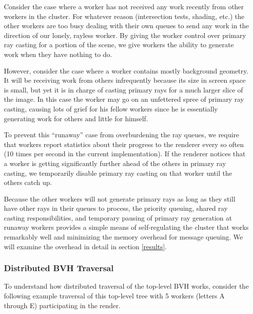 \documentclass[a4paper,twoside]{article}
\begin{document}
Consider the case where a worker has not received any work recently from other
workers in the cluster. For whatever reason (intersection tests, shading, etc.)
the other workers are too busy dealing with their own queues to send any work
in the direction of our lonely, rayless worker. By giving the worker control
over primary ray casting for a portion of the scene, we give workers the ability
to generate work when they have nothing to do.

However, consider the case where a worker contains mostly background
geometry. It will be receiving work from others infrequently because its size
in screen space is small, but yet it is in charge of casting primary rays for
a much larger slice of the image. In this case the worker may go on an
unfettered spree of primary ray casting, causing lots of grief for his fellow
workers since he is essentially generating work for others and little for
himself.

To prevent this ``runaway'' case from overburdening the ray queues, we require
that workers report statistics about their progress to the renderer every so
often (10 times per second in the current implementation). If the renderer
notices that a worker is getting significantly further ahead of the others in
primary ray casting, we temporarily disable primary ray casting on that worker
until the others catch up.

Because the other workers will not generate primary rays as long as they still
have other rays in their queues to process, the priority queuing, shared
ray casting responsibilities, and temporary pausing of primary ray generation at
runaway workers provides a simple means of self-regulating the cluster that
works remarkably well and minimizing the memory overhead for message queuing.
We will examine the overhead in detail in section \ref{results}.

\subsubsection{Distributed BVH Traversal}
\label{traversal}

To understand how distributed traversal of the top-level BVH works, consider
the following example traversal of this top-level tree with 5 workers (letters
A through E) participating in the render.

\end{document}
